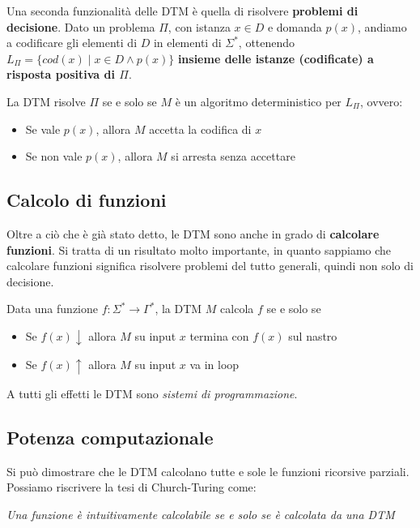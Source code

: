 Una seconda funzionalità delle DTM è quella di risolvere \textbf{problemi di decisione}. Dato un problema $\Pi$, con istanza $x \in D$ e domanda $p(x)$, andiamo a codificare gli elementi di $D$ in elementi di $\Sigma^\ast$, ottenendo $L_\Pi = \{cod(x) \mid x \in D \wedge p(x) \}$ \textbf{insieme delle istanze (codificate) a risposta positiva di $\Pi$}.

La DTM risolve $\Pi$ se e solo se $M$ è un algoritmo deterministico per $L_\Pi$, ovvero: 
\begin{itemize}
	\item Se vale $p(x)$, allora $M$ accetta la codifica di $x$
	
    \item Se non vale $p(x)$, allora $M$ si arresta senza accettare
\end{itemize}

\subsection{Calcolo di funzioni}

Oltre a ciò che è già stato detto, le DTM sono anche in grado di \textbf{calcolare funzioni}. Si tratta di un risultato molto importante, in quanto sappiamo che calcolare funzioni significa risolvere problemi del tutto generali, quindi non solo di decisione.

Data una funzione $f: \Sigma^\ast \rightarrow \Gamma^\ast$, la DTM $M$ calcola $f$ se e solo se
\begin{itemize}
	\item Se $f(x) \downarrow$ allora $M$ su input $x$ termina con $f(x)$ sul nastro
	
    \item Se $f(x) \uparrow$ allora $M$ su input $x$ va in loop
\end{itemize}

A tutti gli effetti le DTM sono \textit{sistemi di programmazione}.

\subsection{Potenza computazionale}

Si può dimostrare che le DTM calcolano tutte e sole le funzioni ricorsive parziali. Possiamo riscrivere la tesi di Church-Turing come: 
\begin{center}
	\textit{Una funzione è intuitivamente calcolabile se e solo se è calcolata da una DTM}
\end{center}


